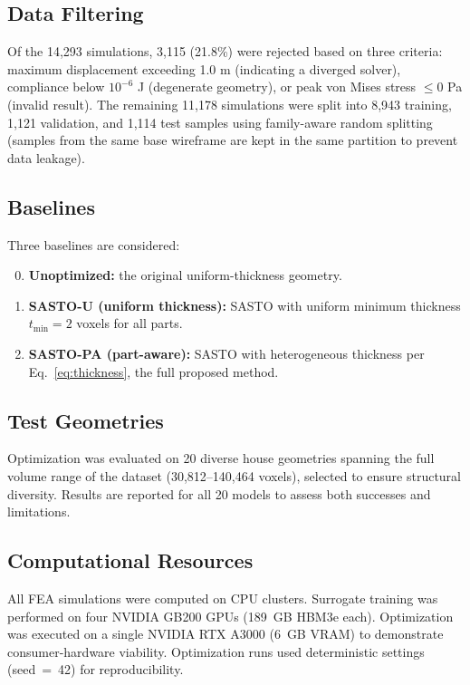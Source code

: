 \documentclass[11pt]{article}
\theoremstyle{plain}
\theoremstyle{definition}
\theoremstyle{remark}
\begin{document}
\subsection{Data Filtering}

Of the 14,293 simulations, 3,115 (21.8\%) were rejected based on three criteria: maximum displacement exceeding 1.0 m (indicating a diverged solver), compliance below $10^{-6}$ J (degenerate geometry), or peak von Mises stress $\leq 0$ Pa (invalid result). The remaining 11,178 simulations were split into 8,943 training, 1,121 validation, and 1,114 test samples using family-aware random splitting (samples from the same base wireframe are kept in the same partition to prevent data leakage).

\subsection{Baselines}

Three baselines are considered:
\begin{enumerate}[label=\textbf{B\arabic*},leftmargin=2.5em]
\setcounter{enumi}{-1}
\item \textbf{Unoptimized:} the original uniform-thickness geometry.
\item \textbf{SASTO-U (uniform thickness):} SASTO with uniform minimum thickness $t_{\min} = 2$ voxels for all parts.
\item \textbf{SASTO-PA (part-aware):} SASTO with heterogeneous thickness per Eq.~\eqref{eq:thickness}, the full proposed method.
\end{enumerate}

\subsection{Test Geometries}

Optimization was evaluated on 20 diverse house geometries spanning the full volume range of the dataset (30,812--140,464 voxels), selected to ensure structural diversity. Results are reported for all 20 models to assess both successes and limitations.

\subsection{Computational Resources}

All FEA simulations were computed on CPU clusters. Surrogate training was performed on four NVIDIA GB200 GPUs (189~GB HBM3e each). Optimization was executed on a single NVIDIA RTX A3000 (6~GB VRAM) to demonstrate consumer-hardware viability. Optimization runs used deterministic settings (seed~=~42) for reproducibility.
\end{document}
